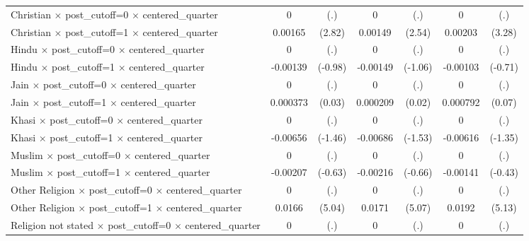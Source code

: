 {\begin{tabular}{l*{3}{cc}}
Christian $\times$ post\_cutoff=0 $\times$ centered\_quarter&           0         &         (.)&           0         &         (.)&           0         &         (.)\\
Christian $\times$ post\_cutoff=1 $\times$ centered\_quarter&     0.00165\sym{**} &      (2.82)&     0.00149\sym{*}  &      (2.54)&     0.00203\sym{**} &      (3.28)\\
Hindu $\times$ post\_cutoff=0 $\times$ centered\_quarter&           0         &         (.)&           0         &         (.)&           0         &         (.)\\
Hindu $\times$ post\_cutoff=1 $\times$ centered\_quarter&    -0.00139         &     (-0.98)&    -0.00149         &     (-1.06)&    -0.00103         &     (-0.71)\\
Jain $\times$ post\_cutoff=0 $\times$ centered\_quarter&           0         &         (.)&           0         &         (.)&           0         &         (.)\\
Jain $\times$ post\_cutoff=1 $\times$ centered\_quarter&    0.000373         &      (0.03)&    0.000209         &      (0.02)&    0.000792         &      (0.07)\\
Khasi $\times$ post\_cutoff=0 $\times$ centered\_quarter&           0         &         (.)&           0         &         (.)&           0         &         (.)\\
Khasi $\times$ post\_cutoff=1 $\times$ centered\_quarter&    -0.00656         &     (-1.46)&    -0.00686         &     (-1.53)&    -0.00616         &     (-1.35)\\
Muslim $\times$ post\_cutoff=0 $\times$ centered\_quarter&           0         &         (.)&           0         &         (.)&           0         &         (.)\\
Muslim $\times$ post\_cutoff=1 $\times$ centered\_quarter&    -0.00207         &     (-0.63)&    -0.00216         &     (-0.66)&    -0.00141         &     (-0.43)\\
Other Religion $\times$ post\_cutoff=0 $\times$ centered\_quarter&           0         &         (.)&           0         &         (.)&           0         &         (.)\\
Other Religion $\times$ post\_cutoff=1 $\times$ centered\_quarter&      0.0166\sym{***}&      (5.04)&      0.0171\sym{***}&      (5.07)&      0.0192\sym{***}&      (5.13)\\
Religion not stated $\times$ post\_cutoff=0 $\times$ centered\_quarter&           0         &         (.)&           0         &         (.)&           0         &         (.)\\

\end{tabular}}
